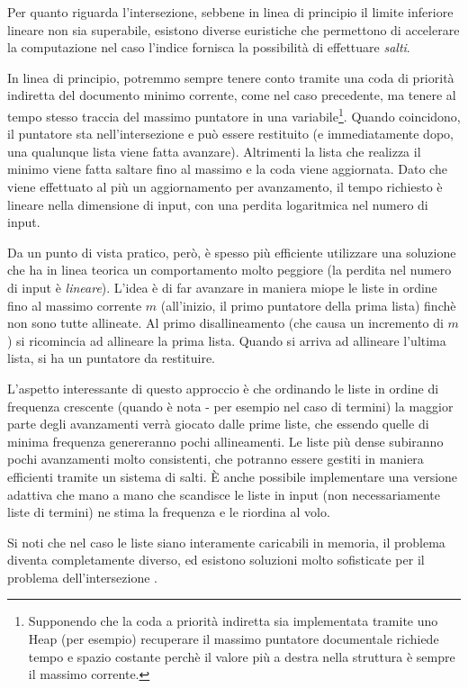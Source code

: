 Per quanto riguarda l'intersezione, sebbene in linea di principio il limite inferiore lineare non sia superabile, esistono diverse euristiche che permettono di accelerare la computazione nel caso l'indice fornisca la possibilità di effettuare \textit{salti}.

In linea di principio, potremmo sempre tenere conto tramite una coda di priorità indiretta del documento minimo corrente, come nel caso precedente, ma tenere al tempo stesso traccia del massimo puntatore in una variabile\footnote{Supponendo che la coda a priorità indiretta sia implementata tramite uno Heap (per esempio) recuperare il massimo puntatore documentale richiede tempo e spazio costante perchè il valore più a destra nella struttura è sempre il massimo corrente.}. Quando coincidono, il puntatore sta nell'intersezione e può essere restituito (e immediatamente dopo, una qualunque lista viene fatta avanzare). Altrimenti la lista che realizza il minimo viene fatta saltare fino al massimo e la coda viene aggiornata. Dato che viene effettuato al più un aggiornamento per avanzamento, il tempo richiesto è lineare nella dimensione di input, con una perdita logaritmica nel numero di input.

Da un punto di vista pratico, però, è spesso più efficiente utilizzare una soluzione che ha in linea teorica un comportamento molto peggiore (la perdita nel numero di input è \textit{lineare}). L'idea è di far avanzare in maniera miope le liste in ordine fino al massimo corrente $m$ (all'inizio, il primo puntatore della prima lista) finchè non sono tutte allineate. Al primo disallineamento (che causa un incremento di $m$) si ricomincia ad allineare la prima lista. Quando si arriva ad allineare l'ultima lista, si ha un puntatore da restituire.

L'aspetto interessante di questo approccio è che ordinando le liste in ordine di frequenza crescente (quando è nota - per esempio nel caso di termini) la maggior parte degli avanzamenti verrà giocato dalle prime liste, che essendo quelle di minima frequenza genereranno pochi allineamenti. Le liste più dense subiranno pochi avanzamenti molto consistenti, che potranno essere gestiti in maniera efficienti tramite un sistema di salti. È anche possibile implementare una versione adattiva che mano a mano che scandisce le liste in input (non necessariamente liste di termini) ne stima la frequenza e le riordina al volo.

Si noti che nel caso le liste siano interamente caricabili in memoria, il problema diventa completamente diverso, ed esistono soluzioni molto sofisticate per il problema dell'intersezione \cite{intersection}.

